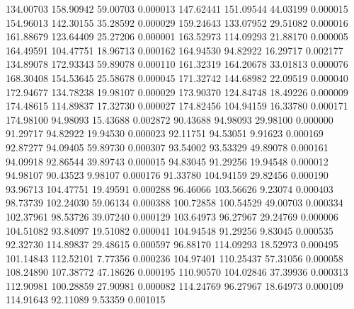       134.00703      158.90942       59.00703       0.000013
      147.62441      151.09544       44.03199       0.000015
      154.96013      142.30155       35.28592       0.000029
      159.24643      133.07952       29.51082       0.000016
      161.88679      123.64409       25.27206       0.000001
      163.52973      114.09293       21.88170       0.000005
      164.49591      104.47751       18.96713       0.000162
      164.94530       94.82922       16.29717       0.002177
      134.89078      172.93343       59.89078       0.000110
      161.32319      164.20678       33.01813       0.000076
      168.30408      154.53645       25.58678       0.000045
      171.32742      144.68982       22.09519       0.000040
      172.94677      134.78238       19.98107       0.000029
      173.90370      124.84748       18.49226       0.000009
      174.48615      114.89837       17.32730       0.000027
      174.82456      104.94159       16.33780       0.000171
      174.98100       94.98093       15.43688       0.002872
       90.43688       94.98093       29.98100       0.000000
       91.29717       94.82922       19.94530       0.000023
       92.11751       94.53051        9.91623       0.000169
       92.87277       94.09405       59.89730       0.000307
       93.54002       93.53329       49.89078       0.000161
       94.09918       92.86544       39.89743       0.000015
       94.83045       91.29256       19.94548       0.000012
       94.98107       90.43523        9.98107       0.000176
       91.33780      104.94159       29.82456       0.000190
       93.96713      104.47751       19.49591       0.000288
       96.46066      103.56626        9.23074       0.000403
       98.73739      102.24030       59.06134       0.000388
      100.72858      100.54529       49.00703       0.000334
      102.37961       98.53726       39.07240       0.000129
      103.64973       96.27967       29.24769       0.000006
      104.51082       93.84097       19.51082       0.000041
      104.94548       91.29256        9.83045       0.000535
       92.32730      114.89837       29.48615       0.000597
       96.88170      114.09293       18.52973       0.000495
      101.14843      112.52101        7.77356       0.000236
      104.97401      110.25437       57.31056       0.000058
      108.24890      107.38772       47.18626       0.000195
      110.90570      104.02846       37.39936       0.000313
      112.90981      100.28859       27.90981       0.000082
      114.24769       96.27967       18.64973       0.000109
      114.91643       92.11089        9.53359       0.001015
